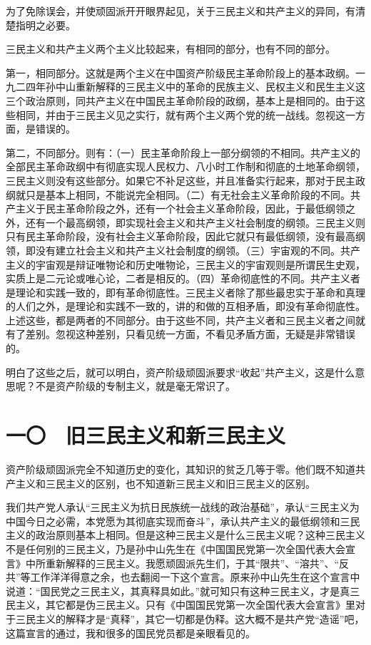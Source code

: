 为了免除误会，并使顽固派开开眼界起见，关于三民主义和共产主义的异同，有清楚指明之必要。

三民主义和共产主义两个主义比较起来，有相同的部分，也有不同的部分。

第一，相同部分。这就是两个主义在中国资产阶级民主革命阶段上的基本政纲。一九二四年孙中山重新解释的三民主义中的革命的民族主义、民权主义和民生主义这三个政治原则，同共产主义在中国民主革命阶段的政纲，基本上是相同的。由于这些相同，并由于三民主义见之实行，就有两个主义两个党的统一战线。忽视这一方面，是错误的。

第二，不同部分。则有：（一）民主革命阶段上一部分纲领的不相同。共产主义的全部民主革命政纲中有彻底实现人民权力、八小时工作制和彻底的土地革命纲领，三民主义则没有这些部分。如果它不补足这些，并且准备实行起来，那对于民主政纲就只是基本上相同，不能说完全相同。（二）有无社会主义革命阶段的不同。共产主义于民主革命阶段之外，还有一个社会主义革命阶段，因此，于最低纲领之外，还有一个最高纲领，即实现社会主义和共产主义社会制度的纲领。三民主义则只有民主革命阶段，没有社会主义革命阶段，因此它就只有最低纲领，没有最高纲领，即没有建立社会主义和共产主义社会制度的纲领。（三）宇宙观的不同。共产主义的宇宙观是辩证唯物论和历史唯物论，三民主义的宇宙观则是所谓民生史观，实质上是二元论或唯心论，二者是相反的。（四）革命彻底性的不同。共产主义者是理论和实践一致的，即有革命彻底性。三民主义者除了那些最忠实于革命和真理的人们之外，是理论和实践不一致的，讲的和做的互相矛盾，即没有革命彻底性。上述这些，都是两者的不同部分。由于这些不同，共产主义者和三民主义者之间就有了差别。忽视这种差别，只看见统一方面，不看见矛盾方面，无疑是非常错误的。

明白了这些之后，就可以明白，资产阶级顽固派要求“收起”共产主义，这是什么意思呢？不是资产阶级的专制主义，就是毫无常识了。

\section{一〇　旧三民主义和新三民主义}

资产阶级顽固派完全不知道历史的变化，其知识的贫乏几等于零。他们既不知道共产主义和三民主义的区别，也不知道新三民主义和旧三民主义的区别。

我们共产党人承认“三民主义为抗日民族统一战线的政治基础”，承认“三民主义为中国今日之必需，本党愿为其彻底实现而奋斗”，承认共产主义的最低纲领和三民主义的政治原则基本上相同。但是这种三民主义是什么三民主义呢？这种三民主义不是任何别的三民主义，乃是孙中山先生在《中国国民党第一次全国代表大会宣言》中所重新解释的三民主义。我愿顽固派先生们，于其“限共”、“溶共”、“反共”等工作洋洋得意之余，也去翻阅一下这个宣言。原来孙中山先生在这个宣言中说道：“国民党之三民主义，其真释具如此。”就可知只有这种三民主义，才是真三民主义，其它都是伪三民主义。只有《中国国民党第一次全国代表大会宣言》里对于三民主义的解释才是“真释”，其它一切都是伪释。这大概不是共产党“造谣”吧，这篇宣言的通过，我和很多的国民党员都是亲眼看见的。

